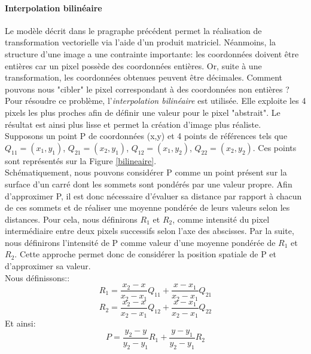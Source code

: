 \paragraph{Interpolation bilinéaire}
Le modèle décrit dans le pragraphe précédent permet la réalisation de transformation vectorielle via l'aide d'un produit matriciel. Néanmoins, la structure d'une image a une contrainte importante: les coordonnées doivent être entières car un pixel possède des coordonnées entières. Or, suite à une transformation, les coordonnées obtenues peuvent être décimales. Comment pouvons nous "cibler" le pixel correspondant à des coordonnées non entières ?\\

\noindent Pour résoudre ce problème, l'\textit{interpolation bilinéaire} est utilisée. Elle exploite les 4 pixels les plus proches afin de définir une valeur pour le pixel "abstrait". Le résultat est ainsi plus lisse et permet la création d'image plus réaliste.\\

\noindent Supposons un point P de coordonnées (x,y) et 4 points de références tels que $Q_{11} = (x_1, y_1)$, $Q_{21} = (x_2, y_1)$, $Q_{12} = (x_1, y_2)$, $Q_{22} = (x_2, y_2)$. Ces points sont représentés sur la Figure \ref{bilineaire}. \\

\noindent Schématiquement, nous pouvons considérer P comme un point présent sur la surface d'un carré dont les sommets sont pondérés par une valeur propre. Afin d'approximer P, il est donc nécessaire d'évaluer sa distance par rapport à chacun de ces sommets et de réaliser une moyenne pondérée de leurs valeurs selon les distances. Pour cela, nous définirons $R_1$ et $R_2$, comme intensité du pixel intermédiaire entre deux pixels successifs selon l'axe des abscisses. Par la suite, nous définirons l'intensité de P comme valeur d'une moyenne pondérée de $R_1$ et $R_2$. Cette approche permet donc de considérer la position spatiale de P et d'approximer sa valeur.\\

\noindent Nous définissons::
$$R_1 = \frac{x_2 - x}{x_2 - x_1}Q_{11} + \frac{x - x_1}{x_2 - x_1}Q_{21}$$
$$R_2 = \frac{x_2 - x}{x_2 - x_1}Q_{12} + \frac{x - x_1}{x_2 - x_1}Q_{22}$$
\noindent Et ainsi:
$$\boxed{P = \frac{y_2 - y}{y_2 - y_1}R_1 + \frac{y - y_1}{y_2 - y_1}R_2}$$

